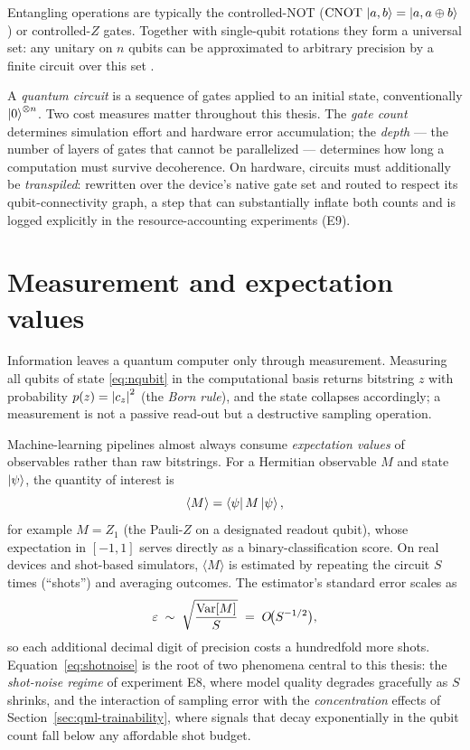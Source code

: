 Entangling operations are typically the controlled-NOT
($\mathrm{CNOT}\,\left|a,b\right\rangle = \left|a, a \oplus b\right\rangle$) or controlled-$Z$ gates.
Together with single-qubit rotations they form a universal set: any unitary on
$n$ qubits can be approximated to arbitrary precision by a finite circuit over
this set \citep{nielsen2010quantum}.

A \emph{quantum circuit} is a sequence of gates applied to an initial state,
conventionally $\left|0\right\rangle^{\otimes n}$. Two cost measures matter throughout this
thesis. The \emph{gate count} determines simulation effort and hardware error
accumulation; the \emph{depth} --- the number of layers of gates that cannot be
parallelized --- determines how long a computation must survive decoherence.
On hardware, circuits must additionally be \emph{transpiled}: rewritten over
the device's native gate set and routed to respect its qubit-connectivity
graph, a step that can substantially inflate both counts and is logged
explicitly in the resource-accounting experiments (E9).

\section{Measurement and expectation values}
\label{sec:qc-measurement}

Information leaves a quantum computer only through measurement. Measuring all
qubits of state \eqref{eq:nqubit} in the computational basis returns bitstring
$z$ with probability $p(z) = \left\lvert c_z\right\rvert^2$ (the \emph{Born rule}), and the state
collapses accordingly; a measurement is not a passive read-out but a
destructive sampling operation.

Machine-learning pipelines almost always consume \emph{expectation values} of
observables rather than raw bitstrings. For a Hermitian observable $M$ and
state $\left|\psi\right\rangle$, the quantity of interest is
\begin{equation}
  \langle M \rangle = \left\langle\psi\right| M \left|\psi\right\rangle,
\end{equation}
for example $M = Z_1$ (the Pauli-$Z$ on a designated readout qubit), whose
expectation in $[-1, 1]$ serves directly as a binary-classification score.
On real devices and shot-based simulators, $\langle M \rangle$ is estimated by
repeating the circuit $S$ times (``shots'') and averaging outcomes. The
estimator's standard error scales as
\begin{equation}
  \varepsilon \;\sim\; \sqrt{\frac{\mathrm{Var}[M]}{S}} \;=\; O\!\bigl(S^{-1/2}\bigr),
  \label{eq:shotnoise}
\end{equation}
so each additional decimal digit of precision costs a hundredfold more shots.
Equation~\eqref{eq:shotnoise} is the root of two phenomena central to this
thesis: the \emph{shot-noise regime} of experiment E8, where model quality
degrades gracefully as $S$ shrinks, and the interaction of sampling error with
the \emph{concentration} effects of Section~\ref{sec:qml-trainability}, where
signals that decay exponentially in the qubit count fall below any affordable
shot budget.

